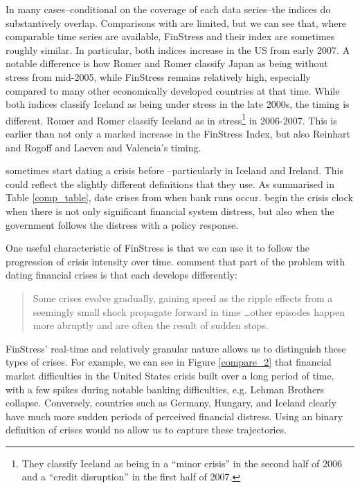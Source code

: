 \documentclass[]{article}
\begin{document}
In many cases--conditional on the coverage of each data series--the indices do substantively overlap. Comparisons with \cite{Romer2015} are limited, but we can see that, where comparable time series are available, FinStress and their index are sometimes roughly similar. In particular, both indices increase in the US from early 2007. A notable difference is how Romer and Romer classify Japan as being without stress from mid-2005, while FinStress remains relatively high, especially compared to many other economically developed countries at that time. While both indices classify Iceland as being under stress in the late 2000s, the timing is different. Romer and Romer classify Iceland as in stress\footnote{They classify Iceland as being in a ``minor crisis'' in the second half of 2006 and a ``credit  disruption'' in the first half of 2007.} in 2006-2007. This is earlier than not only a marked increase in the FinStress Index, but also Reinhart and Rogoff and Laeven and Valencia's timing.

\cite{Reinhart2009} sometimes start dating a crisis before \cite{laeven2013}--particularly in Iceland and Ireland. This could reflect the slightly different definitions that they use. As summarised in Table \ref{comp_table}, \cite{Reinhart2009} date crises from when bank runs occur. \cite{laeven2013} begin the crisis clock when there is not only significant financial system distress, but also when the government follows the distress with a policy response.

One useful characteristic of FinStress is that we can use it to follow the progression of crisis intensity over time. \cite[227]{laeven2013} comment that part of the problem with dating financial crises is that each develops differently:

\begin{quote}
    Some crises evolve gradually, gaining speed as the ripple effects from a seemingly small shock propagate forward in time \ldots other episodes happen more abruptly and are often the result of sudden stops.
\end{quote}

\noindent FinStress' real-time and relatively granular nature allows us to distinguish these types of crises. For example, we can see in Figure \ref{compare_2} that financial market difficulties in the United States crisis built over a long period of time, with a few spikes during notable banking difficulties, e.g. Lehman Brothers collapse. Conversely, countries such as Germany, Hungary, and Iceland clearly have much more sudden periods of perceived financial distress. Using an binary definition of crises would no allow us to capture these trajectories.
\end{document}
